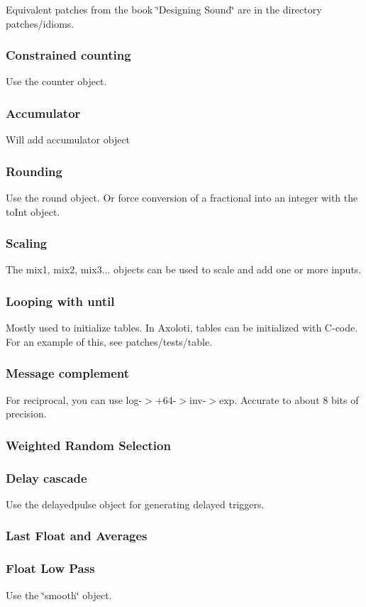 Equivalent patches from the book \char`\"{}\+Designing Sound\char`\"{} are in the directory patches/idioms.

\subsubsection*{Constrained counting}

Use the counter object.

\subsubsection*{Accumulator}

Will add accumulator object

\subsubsection*{Rounding}

Use the round object. Or force conversion of a fractional into an integer with the to\+Int object.

\subsubsection*{Scaling}

The mix1, mix2, mix3... objects can be used to scale and add one or more inputs.

\subsubsection*{Looping with until}

Mostly used to initialize tables. In Axoloti, tables can be initialized with C-\/code. For an example of this, see patches/tests/table.

\subsubsection*{Message complement}

For reciprocal, you can use log-\/$>$+64-\/$>$inv-\/$>$exp. Accurate to about 8 bits of precision.

\subsubsection*{Weighted Random Selection}

\subsubsection*{Delay cascade}

Use the delayedpulse object for generating delayed triggers.

\subsubsection*{Last Float and Averages}

\subsubsection*{Float Low Pass}

Use the \char`\"{}smooth\char`\"{} object. 